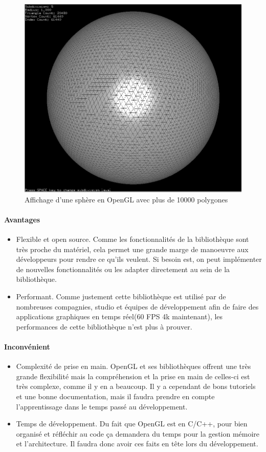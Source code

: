 \documentclass[a4paper]{article}
\begin{document}
\begin{figure}[!h]
\begin{center}\includegraphics[width=0.49\linewidth]{img/icosphere.png} \end{center}
\caption{Affichage d'une sphère en OpenGL avec plus de 10000 polygones}
\end{figure}

\paragraph{Avantages}
    \begin{itemize}
                \item {Flexible et open source.}
                Comme les fonctionnalités de la bibliothèque sont très proche du matériel, cela permet une grande marge de manoeuvre aux développeurs pour rendre ce qu'ils veulent. Si besoin est, on peut implémenter de nouvelles fonctionnalités ou les adapter directement au sein de la bibliothèque.
                
                \item {Performant.}
                Comme justement cette bibliothèque est utilisé par de nombreuses compagnies, studio et équipes de développement afin de faire des applications graphiques en temps réel(60 FPS 4k maintenant), les performances de cette bibliothèque n'est plus à prouver.
    \end{itemize}

\paragraph{Inconvénient}
    \begin{itemize}
                \item {Complexité de prise en main.} 
                OpenGL et ses bibliothèques offrent une très grande flexibilité mais la compréhension et la prise en main de celles-ci est très complexe, comme il y en a beaucoup. Il y a cependant de bons tutoriels et une bonne documentation, mais il faudra prendre en compte l'apprentissage dans le temps passé au développement.
                
                \item {Temps de développement.}
                Du fait que OpenGL est en C/C++, pour bien organisé et réfléchir au code ça demandera du temps pour la gestion mémoire et l'architecture. Il faudra donc avoir ces faits en tête lors du développement.
                
    \end{itemize}
\newpage
\end{document}
